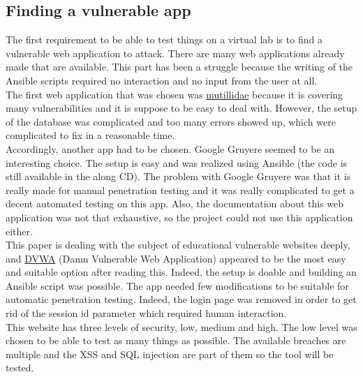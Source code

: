 \documentclass[a4paper,12pt,fleqn]{article}
\begin{document}
\subsection{Finding a vulnerable app}

The first requirement to be able to test things on a virtual lab is to find a vulnerable web application to attack. There are many web applications already made that are available. This part has been a struggle because the writing of the Ansible scripts required no interaction and no input from the user at all. \\
The first web application that was chosen was \href{https://www.giac.org/paper/gwapt/3387/introduction-owasp-mutillidae-ii-web-pen-test-training-environment/126917}{mutillidae} because it is covering many vulnerabilities and it is suppose to be easy to deal with. However, the setup of the database was complicated and too many errors showed up, which were complicated to fix in a reasonable time. \\
Accordingly, another app had to be chosen. Google Gruyere seemed to be an interesting choice. The setup is easy and was realized using Ansible (the code is still available in the along CD). The problem with Google Gruyere was that it is really made for manual penetration testing and it was really complicated to get a decent automated testing on this app. Also, the documentation about this web application was not that exhaustive, so the project could not use this application either. \\ 
This paper\cite{webapps} is dealing with the subject of educational vulnerable websites deeply, and \href{https://www.giac.org/paper/gwapt/3387/introduction-owasp-mutillidae-ii-web-pen-test-training-environment/126917}{DVWA} (Damn Vulnerable Web Application) appeared to be the most easy and suitable option after reading this. Indeed, the setup is doable and building an Ansible script was possible. The app needed few modifications to be suitable for automatic penetration testing. Indeed, the login page was removed in order to get rid of the session id parameter which required human interaction. \\
This website has three levels of security, low, medium and high. The low level was chosen to be able to test as many things as possible. The available breaches are multiple and the XSS and SQL injection are part of them so the tool will be tested.
\end{document}
